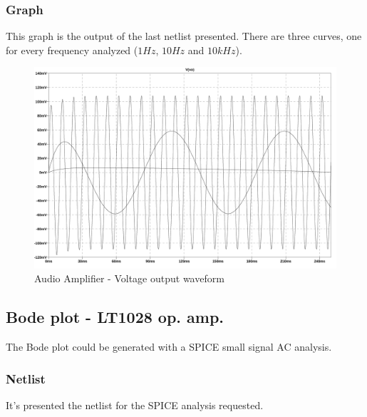 \documentclass[10pt,a4paper]{article}
\begin{document}
\subsubsection{Graph}
This graph is the output of the last netlist presented. There are three curves, one for every frequency analyzed ($1Hz$, $10Hz$ and $10kHz$).
\begin{figure}[H]
  \centering
  \includegraphics[width=14cm]{graph/1d2.jpg}
  \caption{Audio Amplifier - Voltage output waveform}
  \label{1d2graph}
\end{figure}

\subsection{Bode plot - LT1028 op. amp.}
The Bode plot could be generated with a SPICE small signal AC analysis.\par

\subsubsection{Netlist}
It's presented the netlist for the SPICE analysis requested.

\end{document}
